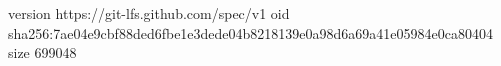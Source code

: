 version https://git-lfs.github.com/spec/v1
oid sha256:7ae04e9cbf88ded6fbe1e3dede04b8218139e0a98d6a69a41e05984e0ca80404
size 699048

